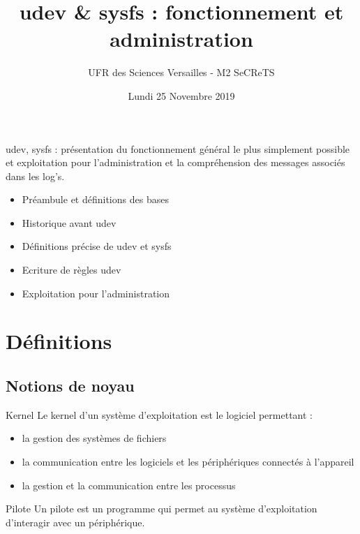 \documentclass{beamer}
\title{udev \& sysfs : fonctionnement et administration}
\author{UFR des Sciences Versailles - M2 SeCReTS}
\institute{CAUMES Clément \& DEBROUASSE Kevin \& \\ HEQUET Jonathan \& Mehdi MTALSI-MERIMI}
\date{Lundi 25 Novembre 2019}
\begin{document}
  \begin{frame}
  \titlepage
  \end{frame}
  
   \begin{frame}
	udev, sysfs : présentation du fonctionnement général le plus simplement possible et exploitation pour l'administration et la compréhension des messages associés dans les log's.
	\begin{itemize}
		[circle]
		\item Préambule et définitions des bases
		\item Historique avant udev
		\item Définitions précise de udev et sysfs
		\item Ecriture de règles udev
		\item Exploitation pour l'administration
	\end{itemize}


\end{frame}

\section{Définitions}

\subsection{Notions de noyau}

 \begin{frame}
	\begin{block}{Kernel} 
	Le kernel d'un système d'exploitation est le logiciel permettant : 
	\begin{itemize}
		[circle]
		\item la gestion des systèmes de fichiers
		\item la communication entre les logiciels et les périphériques connectés à l'appareil
		\item la gestion et la communication entre les processus
	\end{itemize}
	\end{block}

	\begin{block}{Pilote} 
		Un pilote est un programme qui permet au système d'exploitation d'interagir avec un périphérique.
	\end{block}


\end{frame}
\end{document}
